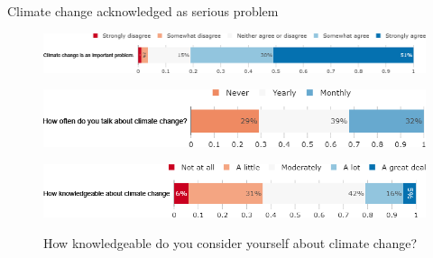 \begin{framefont}{\small}
\begin{frame}{Climate change acknowledged as serious problem}%
\begin{figure}[h!]
\centering
\caption{Do you agree or disagree with the following statement: ``Climate change is an important problem."}
\includegraphics[width=.78\paperwidth]{../figures/FR/CC_problem_FR.png}
\caption{How often do you think or talk with people about climate change?}
\includegraphics[width=.61\paperwidth]{../figures/FR/CC_talks_FR.png}\\
\centering
\caption{How knowledgeable do you consider yourself about climate change?}
\includegraphics[width=.7\paperwidth]{../figures/FR/CC_knowledgeable_FR.png}
\\
\end{figure}
\end{frame}


\end{framefont}
